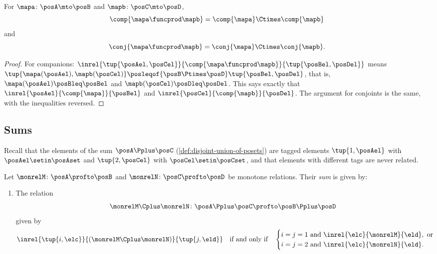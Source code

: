 \begin{lemma}
    \label{lem:companion-product}
    For  $\mapa \colon \posA \mto \posB$ and $\mapb \colon \posC \mto \posD$,
    \begin{equation}
        \comp{\mapa \funcprod \mapb} = \comp{\mapa} \Ctimes \comp{\mapb}
     \end{equation}
     and
     \begin{equation}
        \conj{\mapa \funcprod \mapb} = \conj{\mapa} \Ctimes \conj{\mapb}.
    \end{equation}
\end{lemma}
\begin{proof}
    For companions: $\inrel{\tup{\posAel, \posCel}}{\comp{\mapa \funcprod \mapb}}{\tup{\posBel, \posDel}}$ means $\tup{\mapa(\posAel), \mapb(\posCel)} \posleqof{\posB \Ptimes \posD} \tup{\posBel, \posDel}$, that is, $\mapa(\posAel) \posBleq \posBel$ and $\mapb(\posCel) \posDleq \posDel$.
    This says exactly that $\inrel{\posAel}{\comp{\mapa}}{\posBel}$ and $\inrel{\posCel}{\comp{\mapb}}{\posDel}$.
    The argument for conjoints is the same, with the inequalities reversed.
\end{proof}

\subsection{Sums}

Recall that the elements of the sum $\posA \Pplus \posC$ (\cref{def:disjoint-union-of-posets}) are tagged elements $\tup{1, \posAel}$ with $\posAel \setin \posAset$ and $\tup{2, \posCel}$ with $\posCel \setin \posCset$, and that elements with different tags are never related.

\begin{ctdefinition}
    \label{def:monrel-sum}
    Let $\monrelM \colon \posA \profto \posB$ and $\monrelN \colon \posC \profto \posD$ be monotone relations.
    Their \emph{sum} is given by:

    \constit
    \begin{enumerate}
        \item The relation
              \begin{equation}
                  \monrelM \Cplus \monrelN \colon \posA \Pplus \posC \profto \posB \Pplus \posD
              \end{equation}
              given by
              \begin{equation}
                  \inrel{\tup{i, \elc}}{(\monrelM \Cplus \monrelN)}{\tup{j, \eld}}
                  \quad \text{if and only if} \quad
                  \begin{cases}
                      i = j = 1 \text{ and } \inrel{\elc}{\monrelM}{\eld}, \text{ or} \\
                      i = j = 2 \text{ and } \inrel{\elc}{\monrelN}{\eld}.
                  \end{cases}
              \end{equation}
    \end{enumerate}
\end{ctdefinition}

